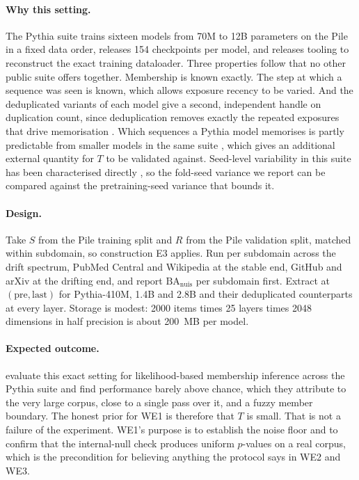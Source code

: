 \documentclass[10pt,twocolumn,letterpaper]{article}
\newcommand{\BA}{\mathrm{BA}}
\newcommand{\nuis}{\mathrm{nuis}}
\begin{document}
\paragraph{Why this setting.} The Pythia suite \cite{biderman2023pythia} trains sixteen models from 70M to 12B parameters on the Pile \cite{gao2020pile} in a fixed data order, releases 154 checkpoints per model, and releases tooling to reconstruct the exact training dataloader. Three properties follow that no other public suite offers together. Membership is known exactly. The step at which a sequence was seen is known, which allows exposure recency to be varied. And the deduplicated variants of each model give a second, independent handle on duplication count, since deduplication removes exactly the repeated exposures that drive memorisation \cite{lee2022dedup}. Which sequences a Pythia model memorises is partly predictable from smaller models in the same suite \cite{biderman2023emergent}, which gives an additional external quantity for $T$ to be validated against. Seed-level variability in this suite has been characterised directly \cite{vanderwal2025polypythias}, so the fold-seed variance we report can be compared against the pretraining-seed variance that bounds it.

\paragraph{Design.} Take $S$ from the Pile training split and $R$ from the Pile validation split, matched within subdomain, so construction E3 applies. Run per subdomain across the drift spectrum, PubMed Central and Wikipedia at the stable end, GitHub and arXiv at the drifting end, and report $\BA_{\nuis}$ per subdomain first. Extract at $(\mathrm{pre},\mathrm{last})$ for Pythia-410M, 1.4B and 2.8B and their deduplicated counterparts at every layer. Storage is modest: 2000 items times 25 layers times 2048 dimensions in half precision is about 200~MB per model.

\paragraph{Expected outcome.} \citet{duan2024mia} evaluate this exact setting for likelihood-based membership inference across the Pythia suite and find performance barely above chance, which they attribute to the very large corpus, close to a single pass over it, and a fuzzy member boundary. The honest prior for WE1 is therefore that $T$ is small. That is not a failure of the experiment. WE1's purpose is to establish the noise floor and to confirm that the internal-null check produces uniform $p$-values on a real corpus, which is the precondition for believing anything the protocol says in WE2 and WE3.
\end{document}

